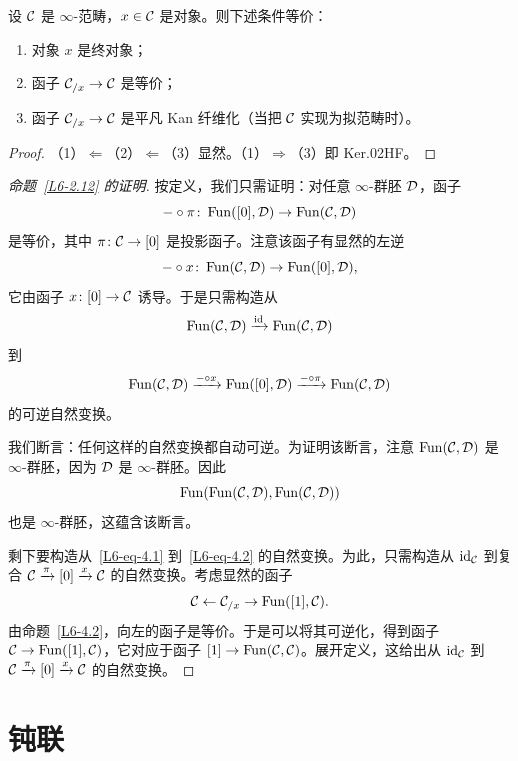 \begin{proposition}\label{L6-4.2}
设 $\mathcal{C}$ 是 $\infty$-范畴，$x\in\mathcal{C}$ 是对象。则下述条件等价：
\begin{enumerate}[label=(\arabic*),leftmargin=2.4em,itemsep=0.1em]
\item 对象 $x$ 是终对象；
\item 函子 $\mathcal{C}_{/x}\to\mathcal{C}$ 是等价；
\item 函子 $\mathcal{C}_{/x}\to\mathcal{C}$ 是平凡 Kan 纤维化（当把 $\mathcal{C}$ 实现为拟范畴时）。
\end{enumerate}
\end{proposition}

\begin{proof}
（1）$\Leftarrow$（2）$\Leftarrow$（3）显然。（1）$\Rightarrow$（3）即 Ker.02HF。
\end{proof}

\begin{proof}[命题~\ref{L6-2.12} 的证明]
按定义，我们只需证明：对任意 $\infty$-群胚 $\mathcal{D}$，函子
\[
-\circ\pi\colon\operatorname{Fun}([0],\mathcal{D})\to\operatorname{Fun}(\mathcal{C},\mathcal{D})
\]
是等价，其中 $\pi\colon\mathcal{C}\to[0]$ 是投影函子。注意该函子有显然的左逆
\[
-\circ x\colon\operatorname{Fun}(\mathcal{C},\mathcal{D})\to\operatorname{Fun}([0],\mathcal{D}),
\]
它由函子 $x\colon[0]\to\mathcal{C}$ 诱导。于是只需构造从
\begin{equation}\label{L6-eq-4.1}
\operatorname{Fun}(\mathcal{C},\mathcal{D})\xrightarrow{\operatorname{id}}\operatorname{Fun}(\mathcal{C},\mathcal{D})
\end{equation}
到
\begin{equation}\label{L6-eq-4.2}
\operatorname{Fun}(\mathcal{C},\mathcal{D})\xrightarrow{-\circ x}\operatorname{Fun}([0],\mathcal{D})\xrightarrow{-\circ\pi}\operatorname{Fun}(\mathcal{C},\mathcal{D})
\end{equation}
的可逆自然变换。

我们断言：任何这样的自然变换都自动可逆。为证明该断言，注意 $\operatorname{Fun}(\mathcal{C},\mathcal{D})$ 是 $\infty$-群胚，因为 $\mathcal{D}$ 是 $\infty$-群胚。因此
\[
\operatorname{Fun}(\operatorname{Fun}(\mathcal{C},\mathcal{D}),\operatorname{Fun}(\mathcal{C},\mathcal{D}))
\]
也是 $\infty$-群胚，这蕴含该断言。

剩下要构造从~\eqref{L6-eq-4.1} 到~\eqref{L6-eq-4.2} 的自然变换。为此，只需构造从 $\operatorname{id}_{\mathcal{C}}$ 到复合 $\mathcal{C}\xrightarrow{\pi}[0]\xrightarrow{x}\mathcal{C}$ 的自然变换。考虑显然的函子
\[
\mathcal{C}\leftarrow\mathcal{C}_{/x}\to\operatorname{Fun}([1],\mathcal{C}).
\]
由命题~\ref{L6-4.2}，向左的函子是等价。于是可以将其可逆化，得到函子 $\mathcal{C}\to\operatorname{Fun}([1],\mathcal{C})$，它对应于函子 $[1]\to\operatorname{Fun}(\mathcal{C},\mathcal{C})$。展开定义，这给出从 $\operatorname{id}_{\mathcal{C}}$ 到 $\mathcal{C}\xrightarrow{\pi}[0]\xrightarrow{x}\mathcal{C}$ 的自然变换。
\end{proof}

\section{钝联}

